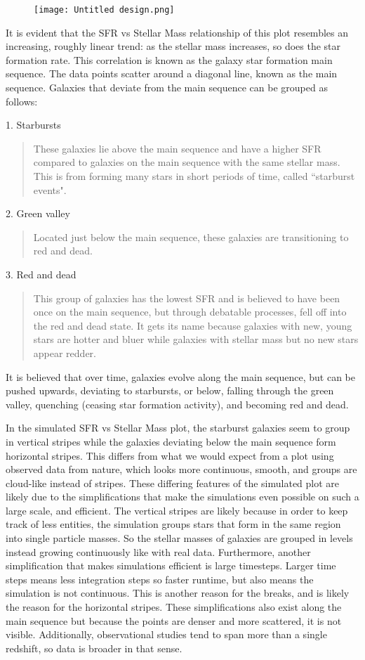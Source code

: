 \documentclass[linenumbers,trackchanges]{aastex7}
\begin{document}
\begin{figure}[h]
    \centering
    \texttt{[image: Untitled design.png]}
    \caption{}
\end{figure}

It is evident that the SFR vs Stellar Mass relationship of this plot resembles an increasing, roughly linear trend: as the stellar mass increases, so does the star formation rate. This correlation is known as the galaxy star formation main sequence. The data points scatter around a diagonal line, known as the main sequence. Galaxies that deviate from the main sequence can be grouped as follows:
\medskip

1. Starbursts
\begin{quote}
These galaxies lie above the main sequence and have a higher SFR compared to galaxies on the main sequence with the same stellar mass. This is from forming many stars in short periods of time, called ``starburst events".
\end{quote}
2. Green valley
\begin{quote}
Located just below the main sequence, these galaxies are transitioning to red and dead.
\end{quote}
3. Red and dead
\begin{quote}
This group of galaxies has the lowest SFR and is believed to have been once on the main sequence, but through debatable processes, fell off into the red and dead state. It gets its name because galaxies with new, young stars are hotter and bluer while galaxies with stellar mass but no new stars appear redder.
\end{quote}

It is believed that over time, galaxies evolve along the main sequence, but can be pushed upwards, deviating to starbursts, or below, falling through the green valley, quenching (ceasing star formation activity), and becoming red and dead.
\medskip

In the simulated SFR vs Stellar Mass plot, the starburst galaxies seem to group in vertical stripes while the galaxies deviating below the main sequence form horizontal stripes. This differs from what we would expect from a plot using observed data from nature, which looks more continuous, smooth, and groups are cloud-like instead of stripes. These differing features of the simulated plot are likely due to the simplifications that make the simulations even possible on such a large scale, and efficient. The vertical stripes are likely because in order to keep track of less entities, the simulation groups stars that form in the same region into single particle masses. So the stellar masses of galaxies are grouped in levels instead growing continuously like with real data. Furthermore, another simplification that makes simulations efficient is large timesteps. Larger time steps means less integration steps so faster runtime, but also means the simulation is not continuous. This is another reason for the breaks, and is likely the reason for the horizontal stripes. These simplifications also exist along the main sequence but because the points are denser and more scattered, it is not visible. Additionally, observational studies tend to span more than a single redshift, so data is broader in that sense.
\medskip
\end{document}
